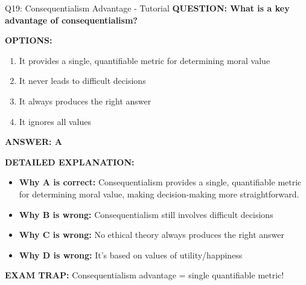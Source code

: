 \documentclass[8pt]{beamer}
\begin{document}
	\begin{frame}{Q19: Consequentialism Advantage - Tutorial}
		\fontsize{6.5}{7.5}\selectfont
		\textbf{QUESTION: What is a key advantage of consequentialism?}
		
		\vspace{0.1cm}
		\textbf{OPTIONS:}
		\begin{enumerate}
			\item It provides a single, quantifiable metric for determining moral value
			\item It never leads to difficult decisions
			\item It always produces the right answer
			\item It ignores all values
		\end{enumerate}
		
		\vspace{0.1cm}
		\textcolor{myblue}{\textbf{ANSWER: A}}
		
		\vspace{0.1cm}
		\textbf{DETAILED EXPLANATION:}
		\begin{itemize}
			\item \textbf{Why A is correct:} Consequentialism provides a single, quantifiable metric for determining moral value, making decision-making more straightforward.
			\item \textbf{Why B is wrong:} Consequentialism still involves difficult decisions
			\item \textbf{Why C is wrong:} No ethical theory always produces the right answer
			\item \textbf{Why D is wrong:} It's based on values of utility/happiness
		\end{itemize}
		
		\textcolor{myred}{\textbf{EXAM TRAP:}} Consequentialism advantage = \textcolor{myblue}{single quantifiable metric}!
	\end{frame}
	
\end{document}
